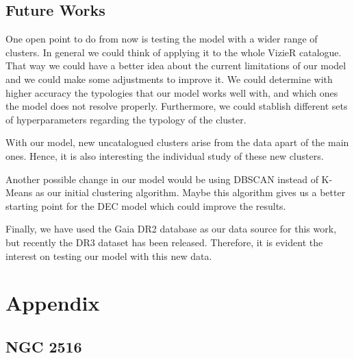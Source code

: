 \documentclass[11pt,a4paper,english,twocolumn]{article}
\begin{document}
\subsection{Future Works}

One open point to do from now is testing the model with a wider range of clusters.
In general we could think of applying it to the whole VizieR catalogue.
That way we could have a better idea about the current limitations of our model
and we could make some adjustments to improve it. We could determine with higher
accuracy the typologies that our model works well with, and which ones the model
does not resolve properly. Furthermore, we could stablish different sets of
hyperparameters regarding the typology of the cluster.

With our model, new uncatalogued clusters arise from the data apart of the main ones.
Hence, it is also interesting the individual study of these new clusters.

Another possible change in our model would be using DBSCAN instead of K-Means
as our initial clustering algorithm. Maybe this algorithm gives us a better starting
point for the DEC model which could improve the results.

Finally, we have used the Gaia DR2 database as our data source for this work,
but recently the DR3 dataset has been released.
Therefore, it is evident the interest on testing our model with this new data.

\appendix
\section{Appendix}
\label{sec:appendix}

\subsection{NGC 2516}
\label{sec:ngc2516}
\end{document}
